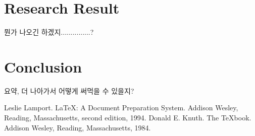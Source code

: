 \documentclass{article}
\theoremstyle{definition}
\begin{document}
\section{Research Result}
뭔가 나오긴 하겠지...............?

\section{Conclusion}
요약, 더 나아가서 어떻게 써먹을 수 있을지?

\begin{thebibliography}{9}
    Leslie Lamport.
    \newblock \LaTeX: A Document Preparation System.
    \newblock Addison Wesley, Reading, Massachusetts, second edition, 1994.
    Donald E. Knuth.
    \newblock The \TeX book.
    \newblock Addison Wesley, Reading, Massachusetts, 1984.
\end{thebibliography}
\end{document}
